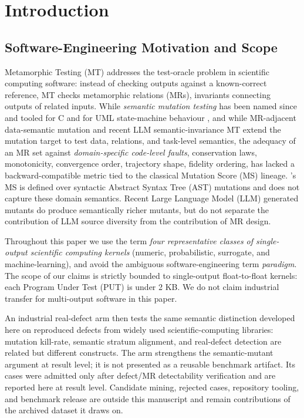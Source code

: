\documentclass[review,12pt,authoryear]{elsarticle}
\begin{document}
\section{Introduction}\label{introduction}

\subsection{Software-Engineering Motivation and Scope}\label{motivation-and-scope}

Metamorphic Testing (MT) addresses the test-oracle problem in scientific
computing software: instead of checking outputs against a known-correct
reference, MT checks metamorphic relations (MRs), invariants connecting
outputs of related inputs. While \emph{semantic mutation testing} has
been named since \citet{7a6c280d9584691800e71876c716ea229335abeb} and tooled for C \citep{dan2012smtc}
and for UML state-machine behaviour \citep{derezinska2019uml}, and while
MR-adjacent data-semantic mutation \citep{sun2016mumt,sun2024datamutation,zhu2020datamorphic,chan2024metamorphic}
and recent LLM semantic-invariance MT \citep{0fa97cc4e2a0ffb6a777669b1b541c0372fac0d2} extend the mutation target
to test data, relations, and task-level semantics, the adequacy of an MR
set against \emph{domain-specific code-level faults}, conservation laws,
monotonicity, convergence order, trajectory shape, fidelity ordering,
has lacked a backward-compatible metric tied to the classical Mutation
Score (MS) lineage. \citeauthor{d7c38286734419b52de4262c9802ebdfcf4b9447}'s \citeyearpar{d7c38286734419b52de4262c9802ebdfcf4b9447} MS is defined over syntactic
Abstract Syntax Tree (AST) mutations and does not capture these domain
semantics. Recent Large Language Model (LLM) generated mutants \citep{tip2025llmorpheus,humbatova2021deepcrime} do
produce semantically richer mutants, but do not separate the
contribution of LLM source diversity from the contribution of MR design.

Throughout this paper we use the term \emph{four representative classes
of single-output scientific computing kernels} (numeric, probabilistic,
surrogate, and machine-learning), and avoid the ambiguous
software-engineering term \emph{paradigm}. The scope of our claims is
strictly bounded to single-output float-to-float kernels: each
Program Under Test (PUT) is under 2 KB. We do not claim industrial transfer
for multi-output software in this paper.

An industrial real-defect arm then tests the same semantic
distinction developed here on reproduced defects from widely used
scientific-computing libraries: mutation kill-rate, semantic stratum
alignment, and real-defect detection are related but different
constructs. The arm strengthens the semantic-mutant argument at result
level; it is not presented as a reusable benchmark artifact. Its cases
were admitted only after defect/MR detectability verification and are
reported here at result level. Candidate mining, rejected cases,
repository tooling, and benchmark release are outside this manuscript
and remain contributions of the archived dataset it draws on.
\end{document}
